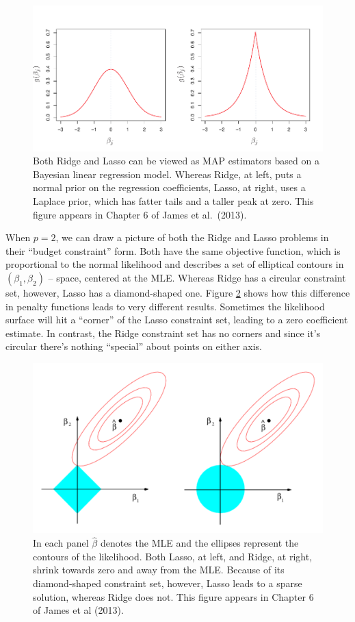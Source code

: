 \documentclass[12pt]{article}
\theoremstyle{definition}
\begin{document}
\begin{figure}
	\centering
	\includegraphics[scale=0.85]{ISLR_ch6_fig11}
	\caption{Both Ridge and Lasso can be viewed as MAP estimators based on a Bayesian linear regression model. Whereas Ridge, at left, puts a normal prior on the regression coefficients, Lasso, at right, uses a Laplace prior, which has fatter tails and a taller peak at zero. This figure appears in Chapter 6 of James et al.\ (2013).}
	\label{fig:ridge_lasso_prior}
\end{figure}

When $p=2$, we can draw a picture of both the Ridge and Lasso problems in their ``budget constraint'' form. Both have the same objective function, which is proportional to the normal likelihood and describes a set of elliptical contours in $(\beta_1,\beta_2)$ -- space, centered at the MLE. Whereas Ridge has a circular constraint set, however, Lasso has a diamond-shaped one. Figure \ref{fig:ridge_lasso_constraint} shows how this difference in penalty functions leads to very different results. Sometimes the likelihood surface will hit a ``corner'' of the Lasso constraint set, leading to a zero coefficient estimate. In contrast, the Ridge constraint set has no corners and since it's circular there's nothing ``special'' about points on either axis.

\begin{figure}
	\centering
	\includegraphics[scale=0.6]{ISLR_ch6_fig7}
	\caption{In each panel $\widehat{\beta}$ denotes the MLE and the ellipses represent the contours of the likelihood. Both Lasso, at left, and Ridge, at right, shrink towards zero and away from the MLE. Because of its diamond-shaped constraint set, however, Lasso leads to a sparse solution, whereas Ridge does not. This figure appears in Chapter 6 of James et al (2013).}
	\label{fig:ridge_lasso_constraint}
\end{figure}
\end{document}
